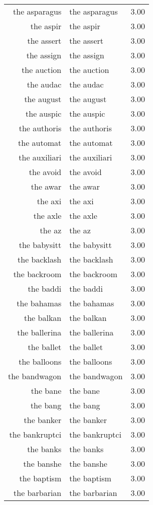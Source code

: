 \begin{table}[ht]
\begin{tabular}{rlr}
  the asparagus & the asparagus & 3.00 \\ 
  the aspir & the aspir & 3.00 \\ 
  the assert & the assert & 3.00 \\ 
  the assign & the assign & 3.00 \\ 
  the auction & the auction & 3.00 \\ 
  the audac & the audac & 3.00 \\ 
  the august & the august & 3.00 \\ 
  the auspic & the auspic & 3.00 \\ 
  the authoris & the authoris & 3.00 \\ 
  the automat & the automat & 3.00 \\ 
  the auxiliari & the auxiliari & 3.00 \\ 
  the avoid & the avoid & 3.00 \\ 
  the awar & the awar & 3.00 \\ 
  the axi & the axi & 3.00 \\ 
  the axle & the axle & 3.00 \\ 
  the az & the az & 3.00 \\ 
  the babysitt & the babysitt & 3.00 \\ 
  the backlash & the backlash & 3.00 \\ 
  the backroom & the backroom & 3.00 \\ 
  the baddi & the baddi & 3.00 \\ 
  the bahamas & the bahamas & 3.00 \\ 
  the balkan & the balkan & 3.00 \\ 
  the ballerina & the ballerina & 3.00 \\ 
  the ballet & the ballet & 3.00 \\ 
  the balloons & the balloons & 3.00 \\ 
  the bandwagon & the bandwagon & 3.00 \\ 
  the bane & the bane & 3.00 \\ 
  the bang & the bang & 3.00 \\ 
  the banker & the banker & 3.00 \\ 
  the bankruptci & the bankruptci & 3.00 \\ 
  the banks & the banks & 3.00 \\ 
  the banshe & the banshe & 3.00 \\ 
  the baptism & the baptism & 3.00 \\ 
  the barbarian & the barbarian & 3.00 \\ 

\end{tabular}
\end{table}
